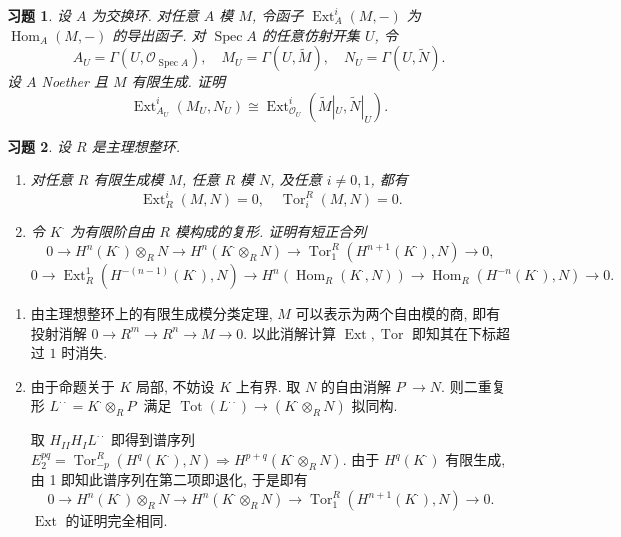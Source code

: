 \documentclass{article}
\theoremstyle{exercise}
\newtheorem{exercise}{习题}[section]
\theoremstyle{plain}
\theoremstyle{remark}
\newenvironment{proofc}{\proof}{\endproof}
\def\sO{\mathscr{O}}
\def\Hom{\operatorname{Hom}}
\def\Spec{\operatorname{Spec}}
\def\Tot{\operatorname{Tot}}
\def\Ext{\operatorname{Ext}}
\def\Tor{\operatorname{Tor}}
\def\Tot{\operatorname{Tot}}
\def\kom{^{\boldsymbol{\cdot}}}
\def\komm{^{\boldsymbol{\cdot\cdot}}}
\begin{document}
\begin{exercise}
  设 $A$ 为交换环. 对任意 $A$ 模 $M$, 令函子 $\Ext_A^i(M, -)$ 为 $\Hom_A(M, -)$ 的导出函子.
  对 $\Spec A$ 的任意仿射开集 $U$, 令
  \[
    A_U = \Gamma(U, \sO_{\Spec A}), \quad
    M_U = \Gamma(U, \tilde{M}), \quad
    N_U = \Gamma(U, \tilde{N}).
  \]
  设 $A$ Noether 且 $M$ 有限生成.
  证明
  \[
    \Ext_{A_U}^i(M_U, N_U) \cong \Ext_{\sO_U}^i(\tilde{M}|_U, \tilde{N}|_U).
  \]
\end{exercise}

\begin{exercise}
  设 $R$ 是主理想整环.
  \begin{enumerate}
    \item 对任意 $R$ 有限生成模 $M$, 任意 $R$ 模 $N$,
          及任意 $i \neq 0, 1$, 都有
          \[
            \Ext_R^i(M, N) = 0, \quad \Tor_i^R(M, N) = 0.
          \]
    \item 令 $K\kom$ 为有限阶自由 $R$ 模构成的复形.
          证明有短正合列
          \[
            0 \to H^n(K\kom) \otimes_R N \to H^n(K\kom \otimes_R N)
            \to \Tor_1^R(H^{n + 1}(K\kom), N) \to 0,
          \]
          \[
            0 \to \Ext_R^1(H^{-(n-1)}(K\kom), N)
            \to  H^n(\Hom_R(K\kom, N))
            \to \Hom_R(H^{-n}(K\kom), N) \to 0.
          \]
  \end{enumerate}
\end{exercise}

\begin{proofc} \hfill
  \begin{enumerate}
    \item 由主理想整环上的有限生成模分类定理, $M$ 可以表示为两个自由模的商,
    即有投射消解 $0 \to R^m \to R^n \to M \to 0$.
    以此消解计算 $\Ext, \Tor$ 即知其在下标超过 $1$ 时消失.
    \item 由于命题关于 $K$ 局部, 不妨设 $K$ 上有界.
          取 $N$ 的自由消解 $P\kom \to N$.
          则二重复形 $L\komm = K\kom \otimes_R P\kom$
          满足 $\Tot(L\komm) \to (K\kom \otimes_R N)$ 拟同构.

          取 $H_{II} H_{I} L\komm$
          即得到谱序列 $E_2^{pq} = \Tor_{-p}^R(H^q(K\kom), N) \Rightarrow H^{p+q}(K\kom \otimes_R N)$.
          由于 $H^q(K\kom)$ 有限生成, 由 1 即知此谱序列在第二项即退化, 于是即有
          \[
            0 \to H^n(K\kom) \otimes_R N \to H^n(K\kom \otimes_R N)
            \to \Tor_1^R(H^{n + 1}(K\kom), N) \to 0.
          \]
          $\Ext$ 的证明完全相同. \qedhere
  \end{enumerate}
\end{proofc}
\end{document}
